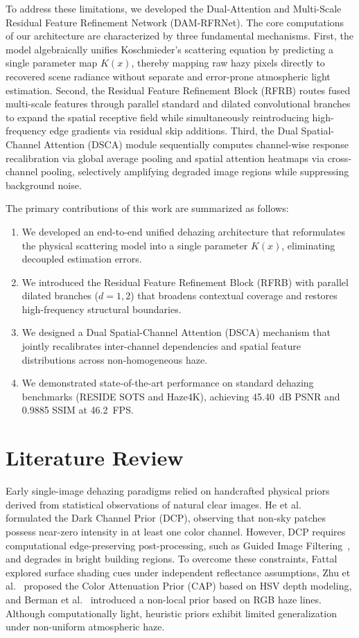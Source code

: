 \documentclass[journal]{IEEEtran}
\begin{document}
To address these limitations, we developed the Dual-Attention and Multi-Scale Residual Feature Refinement Network (DAM-RFRNet). The core computations of our architecture are characterized by three fundamental mechanisms. First, the model algebraically unifies Koschmieder's scattering equation by predicting a single parameter map $K(x)$, thereby mapping raw hazy pixels directly to recovered scene radiance without separate and error-prone atmospheric light estimation. Second, the Residual Feature Refinement Block (RFRB) routes fused multi-scale features through parallel standard and dilated convolutional branches to expand the spatial receptive field while simultaneously reintroducing high-frequency edge gradients via residual skip additions. Third, the Dual Spatial-Channel Attention (DSCA) module sequentially computes channel-wise response recalibration via global average pooling and spatial attention heatmaps via cross-channel pooling, selectively amplifying degraded image regions while suppressing background noise.

The primary contributions of this work are summarized as follows:
\begin{enumerate}
    \item We developed an end-to-end unified dehazing architecture that reformulates the physical scattering model into a single parameter $K(x)$, eliminating decoupled estimation errors.
    \item We introduced the Residual Feature Refinement Block (RFRB) with parallel dilated branches ($d=1, 2$) that broadens contextual coverage and restores high-frequency structural boundaries.
    \item We designed a Dual Spatial-Channel Attention (DSCA) mechanism that jointly recalibrates inter-channel dependencies and spatial feature distributions across non-homogeneous haze.
    \item We demonstrated state-of-the-art performance on standard dehazing benchmarks (RESIDE SOTS and Haze4K), achieving 45.40~dB PSNR and 0.9885 SSIM at 46.2~FPS.
\end{enumerate}

\section{Literature Review}
Early single-image dehazing paradigms relied on handcrafted physical priors derived from statistical observations of natural clear images. He et al.~\cite{he2011dark} formulated the Dark Channel Prior (DCP), observing that non-sky patches possess near-zero intensity in at least one color channel. However, DCP requires computational edge-preserving post-processing, such as Guided Image Filtering~\cite{he2013guided}, and degrades in bright building regions. To overcome these constraints, Fattal~\cite{fattal2008single} explored surface shading cues under independent reflectance assumptions, Zhu et al.~\cite{zhu2015fast} proposed the Color Attenuation Prior (CAP) based on HSV depth modeling, and Berman et al.~\cite{berman2016non} introduced a non-local prior based on RGB haze lines. Although computationally light, heuristic priors exhibit limited generalization under non-uniform atmospheric haze.
\end{document}

